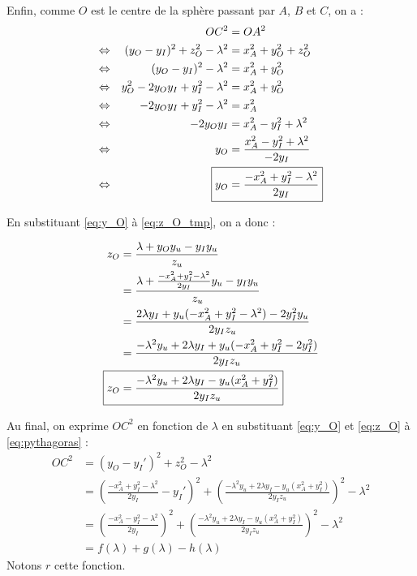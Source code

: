 \documentclass{article}
\begin{document}
\begin{enumerate}
    Enfin, comme $O$ est le centre de la sphère passant par $A$, $B$ et $C$, on a :
    \begin{align}
        && OC^2 &= OA^2\nonumber\\
        \Leftrightarrow && (y_O - y_I)^2 + z_O^2 - \lambda^2 &= x_A^2 + y_O^2 + z_O^2\nonumber\\
        \Leftrightarrow && (y_O - y_I)^2 - \lambda^2 &= x_A^2 + y_O^2\nonumber\\
        \Leftrightarrow && y_O^2 - 2y_O y_I + y_I^2 - \lambda^2 &= x_A^2 + y_O^2\nonumber\\
        \Leftrightarrow && -2y_O y_I + y_I^2 - \lambda^2 &= x_A^2\nonumber\\
        \Leftrightarrow && -2y_O y_I &= x_A^2 - y_I^2 + \lambda^2 \nonumber\\
        \Leftrightarrow && y_O &= \frac{x_A^2 - y_I^2 + \lambda^2}{-2y_I}\nonumber\\
        \Leftrightarrow && \Aboxed{y_O &= \frac{-x_A^2 + y_I^2 - \lambda^2}{2y_I}}\label{eq:y_O}
    \end{align}
    
    En substituant \ref{eq:y_O} à \ref{eq:z_O_tmp}, on a donc :
    
    \begin{align}
        z_O &= \frac{\lambda + y_Oy_u - y_Iy_u}{z_u} \nonumber\\
            &= \frac{\lambda + \frac{-x_A^2 + y_I^2 - \lambda^2}{2y_I}y_u - y_Iy_u}{z_u} \nonumber\\
            &= \frac{2\lambda y_I + y_u(-x_A^2 + y_I^2 - \lambda^2) - 2y_I^2y_u}{2y_Iz_u}  \nonumber\\
            &= \frac{-\lambda^2y_u + 2\lambda y_I + y_u(-x_A^2 + y_I^2 - 2y_I^2)}{2y_Iz_u}  \nonumber\\
            \Aboxed{ z_O &= \frac{-\lambda^2y_u + 2\lambda y_I  - y_u(x_A^2 + y_I^2)}{2y_Iz_u}}  \label{eq:z_O}
    \end{align}
    

    Au final, on exprime $OC^2$ en fonction de $\lambda$ en substituant \ref{eq:y_O} et \ref{eq:z_O} à \ref{eq:pythagoras} :
    \begin{align*}
    OC^2 &= (y_O - y_I')^2 + z_O^2 - \lambda^2 \\
         &= \left(\frac{-x_A^2 + y_I^2 - \lambda^2}{2y_I} - y_I'\right)^2 + \left(\frac{-\lambda^2y_u + 2\lambda y_I  - y_u(x_A^2 + y_I^2)}{2y_Iz_u}\right)^2 - \lambda^2 \\
          &= \left(\frac{-x_A^2 - y_I^2 - \lambda^2}{2y_I}\right)^2 + \left( \frac{-\lambda^2y_u + 2\lambda y_I  - y_u(x_A^2 + y_I^2)}{2y_Iz_u}\right)^2 - \lambda^2 \\
         &= f(\lambda) + g(\lambda) - h(\lambda)
    \end{align*}
    Notons $r$ cette fonction.
    

\end{enumerate}
\end{document}

